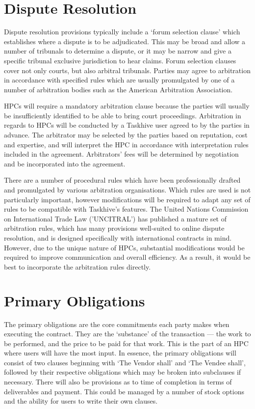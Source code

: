 \documentclass[a4paper,12pt]{article}
\begin{document}
\section{Dispute Resolution}

Dispute resolution provisions typically include a `forum selection clause' which establishes where a dispute is to be adjudicated. This may be broad and allow a number of tribunals to determine a dispute, or it may be narrow and give a specific tribunal exclusive jurisdiction to hear claims. Forum selection clauses cover not only courts, but also arbitral tribunals. Parties may agree to arbitration in accordance with specified rules which are usually promulgated by one of a number of arbitration bodies such as the American Arbitration Association.

HPCs will require a mandatory arbitration clause because the parties will usually be insufficiently identified to be able to bring court proceedings. Arbitration in regards to HPCs will be conducted by a Taskhive user agreed to by the parties in advance. The arbitrator may be selected by the parties based on reputation, cost and expertise, and will interpret the HPC in accordance with interpretation rules included in the agreement. Arbitrators' fees will be determined by negotiation and be incorporated into the agreement.

There are a number of procedural rules which have been professionally drafted and promulgated by various arbitration organisations. Which rules are used is not particularly important, however modifications will be required to adapt any set of rules to be compatible with Taskhive's features. The United Nations Commission on International Trade Law ('UNCITRAL') has published a mature set of arbitration rules, which has many provisions well-suited to online dispute resolution, and is designed specifically with international contracts in mind. However, due to the unique nature of HPCs, substantial modifications would be required to improve communication and overall efficiency. As a result, it would be best to incorporate the arbitration rules directly.

\section{Primary Obligations}

The primary obligations are the core commitments each party makes when executing the contract. They are the `substance' of the transaction --- the work to be performed, and the price to be paid for that work. This is the part of an HPC where users will have the most input. In essence, the primary obligations will consist of two clauses beginning with `The Vendor shall' and `The Vendee shall', followed by their respective obligations which may be broken into subclauses if necessary. There will also be provisions as to time of completion in terms of deliverables and payment. This could be managed by a number of stock options and the ability for users to write their own clauses.
\end{document}

